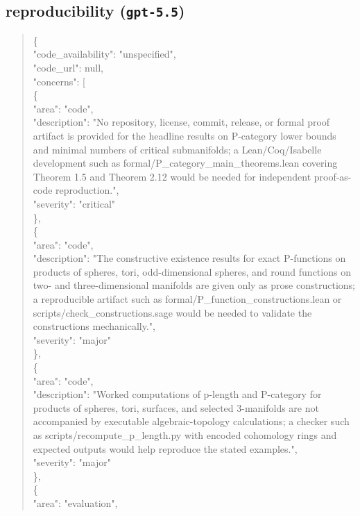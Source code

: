 \documentclass[11pt]{article}
\begin{document}
\subsection*{reproducibility (\texttt{gpt-5.5})}
\begin{quote}\small\ttfamily\raggedright
\{\\
  "code\_availability": "unspecified",\\
  "code\_url": null,\\
  "concerns": [\\
    \{\\
      "area": "code",\\
      "description": "No repository, license, commit, release, or formal proof artifact is provided for the headline results on P-category lower bounds and minimal numbers of critical submanifolds; a Lean/Coq/Isabelle development such as formal/P\_category\_main\_theorems.lean covering Theorem 1.5 and Theorem 2.12 would be needed for independent proof-as-code reproduction.",\\
      "severity": "critical"\\
    \},\\
    \{\\
      "area": "code",\\
      "description": "The constructive existence results for exact P-functions on products of spheres, tori, odd-dimensional spheres, and round functions on two- and three-dimensional manifolds are given only as prose constructions; a reproducible artifact such as formal/P\_function\_constructions.lean or scripts/check\_constructions.sage would be needed to validate the constructions mechanically.",\\
      "severity": "major"\\
    \},\\
    \{\\
      "area": "code",\\
      "description": "Worked computations of p-length and P-category for products of spheres, tori, surfaces, and selected 3-manifolds are not accompanied by executable algebraic-topology calculations; a checker such as scripts/recompute\_p\_length.py with encoded cohomology rings and expected outputs would help reproduce the stated examples.",\\
      "severity": "major"\\
    \},\\
    \{\\
      "area": "evaluation",\\

\end{quote}
\end{document}
